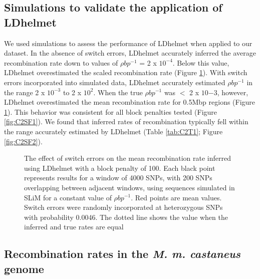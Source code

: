 \subsection{Simulations to validate the application of LDhelmet}

We used simulations to assess the performance of LDhelmet when applied to our dataset. In the absence of switch errors, LDhelmet accurately inferred the average recombination rate down to values of $\rho bp^{-1}$ = 2 x $10^{-4}$. Below this value, LDhelmet overestimated the scaled recombination rate (Figure \ref{fig:C2F1}). With switch errors incorporated into simulated data, LDhelmet accurately estimated $\rho bp^{-1}$ in the range 2 x $10^{-3}$ to 2 x $10^2$. When the true $\rho bp^{-1}$ was $<$ 2 x $10{-3}$, however, LDhelmet overestimated the mean recombination rate for 0.5Mbp regions (Figure \ref{fig:C2F1}). This behavior was consistent for all block penalties tested (Figure \ref{fig:C2SF1}). We found that inferred rates of recombination typically fell within the range accurately estimated by LDhelmet (Table \ref{tab:C2T1}; Figure \ref{fig:C2SF2}).
 
  \begin{figure}[h]
   \centering      
   \noindent{}
 \caption[The effect of switch errors on recombination rate inference]{The effect of switch errors on the mean recombination rate inferred using LDhelmet with a block penalty of 100. Each black point represents results for a window of 4000 SNPs, with 200 SNPs overlapping between adjacent windows, using sequences simulated in SLiM for a constant value of $\rho bp^{-1}$. Red points are mean values. Switch errors were randomly incorporated at heterozygous SNPs with probability 0.0046. The dotted line shows the value when the inferred and true rates are equal}
\label{fig:C2F1}
\end{figure}

\subsection{Recombination rates in the \textit{\textit{M. m. castaneus}} genome}
 

